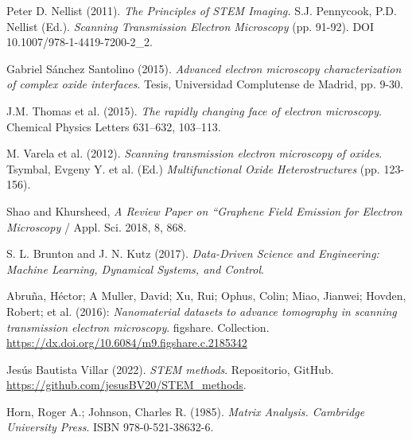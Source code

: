 
 \normalsize



\begin{thebibliography}{9}

Peter D. Nellist (2011). \textit{The Principles of STEM Imaging.} S.J. Pennycook, P.D. Nellist (Ed.). \textit{Scanning Transmission Electron Microscopy }(pp. 91-92). DOI 10.1007/978-1-4419-7200-2\_2. 

Gabriel Sánchez Santolino (2015). \textit{Advanced electron microscopy characterization of complex oxide interfaces}. Tesis, Universidad Complutense de Madrid, pp. 9-30.

J.M. Thomas et al. (2015). \textit{The rapidly changing face of electron microscopy}. Chemical Physics Letters 631–632, 103–113.

M. Varela et al. (2012). \textit{Scanning transmission electron microscopy of oxides}. Tsymbal, Evgeny Y. et al. (Ed.) \textit{Multifunctional Oxide Heterostructures} (pp. 123-156).

Shao and Khursheed, \textit{A Review Paper on “Graphene Field Emission for Electron Microscopy} / Appl. Sci. 2018, 8, 868.

S. L. Brunton and J. N. Kutz (2017). \textit{Data-Driven Science and Engineering: Machine Learning, Dynamical Systems, and Control}.

Abruña, Héctor; A Muller, David; Xu, Rui; Ophus, Colin; Miao, Jianwei; Hovden, Robert; et al. (2016): \textit{Nanomaterial datasets to advance tomography in scanning transmission electron microscopy}. figshare. Collection. \href{https://dx.doi.org/10.6084/m9.figshare.c.2185342}{https://dx.doi.org/10.6084/m9.figshare.c.2185342}

Jesús Bautista Villar (2022). \textit{STEM methods}. Repositorio, GitHub. \\ \url{https://github.com/jesusBV20/STEM_methods}.

Horn, Roger A.; Johnson, Charles R. (1985). \textit{Matrix Analysis. Cambridge University Press}. ISBN 978-0-521-38632-6.



\end{thebibliography}
